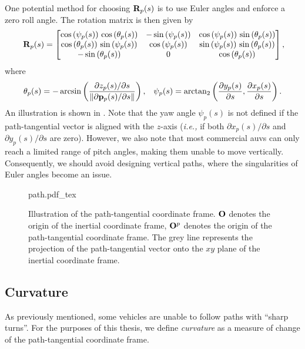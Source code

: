 One potential method for choosing $\mathbf{R}_p(s)$ is to use Euler angles and enforce a zero roll angle.
The rotation matrix is then given by
\begin{equation}
    \mat{R}_p(s) =
    \begin{bmatrix}
         \cos\left(\psi_{p}(s)\right)\,\cos\left(\theta_{p}(s)\right) & -\sin\left(\psi_{p}(s)\right) & \cos\left(\psi_{p}(s)\right)\,\sin\left(\theta_{p}(s)\right) \\ \cos\left(\theta_{p}(s)\right)\,\sin\left(\psi_{p}(s)\right) & \cos\left(\psi_{p}(s)\right) & \sin\left(\psi_{p}(s)\right)\,\sin\left(\theta_{p}(s)\right) \\ -\sin\left(\theta_{p}(s)\right) & 0 & \cos\left(\theta_{p}(s)\right)
    \end{bmatrix}\mathrlap{,}
    \label{eq:background_R_p_zero_roll}
\end{equation}
where
\begin{align}
    \theta_{p}(s) &= - \arcsin\left(\frac{\partial z_p(s) / \partial s}{\left\|\partial \mathbf{p}_p(s) / \partial s\right\|}\right), &
    \psi_{p}(s) = \mathrm{arctan}_{2}\left(\frac{\partial  y_{p}(s)}{\partial s}, \frac{\partial  x_{p}(s)}{\partial s}\right).
    \label{eq:background_path_tangential_3D}
\end{align}
An illustration is shown in .
Note that the yaw angle $\psi_{p}(s)$ is not defined if the path-tangential vector is aligned with the $z$-axis (\emph{i.e.,} if both $\partial x_p(s) / \partial s$ and $\partial y_p(s) / \partial s$ are zero).
However, we also note that most commercial \glspl{auv} can only reach a limited range of pitch angles, making them unable to move vertically.
Consequently, we should avoid designing vertical paths, where the singularities of Euler angles become an issue.

\begin{figure}[t]
    \centering
    \def\svgwidth{0.6\textwidth}
    {path.pdf_tex}
    \vspace*{-1em}
    \caption{Illustration of the path-tangential coordinate frame. $\mathbf{O}$ denotes the origin of the inertial coordinate frame, $\mathbf{O}^p$ denotes the origin of the path-tangential coordinate frame. The grey line represents the projection of the path-tangential vector onto the $xy$ plane of the inertial coordinate frame.}
    \label{fig:background_path}
\end{figure}

\subsection{Curvature}
As previously mentioned, some vehicles are unable to follow paths with ``sharp turns''.
For the purposes of this thesis, we define \emph{curvature} as a measure of change of the path-tangential coordinate frame.

